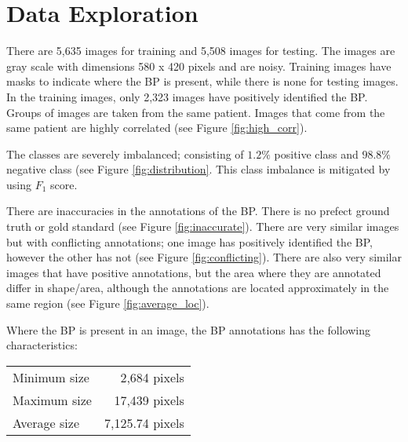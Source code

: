 \section{Data Exploration}
There are 5,635 images for training and 5,508 images for testing. The images are gray scale with dimensions 580 x 420 pixels and are noisy. Training images have masks to indicate where the BP is present, while there is none for testing images. In the training images, only 2,323 images have positively identified the BP.
Groups of images are taken from the same patient.  Images that come from the same patient are highly correlated (see Figure \ref{fig:high_corr}).

The classes are severely imbalanced; consisting of $1.2\%$ positive class and $98.8\%$ negative class (see Figure \ref{fig:distribution}. This class imbalance is mitigated by using $F_1$ score.

There are inaccuracies in the annotations of the BP. There is no prefect ground truth or gold standard (see Figure \ref{fig:inaccurate}). There are very similar images but with conflicting annotations; one image has positively identified the BP, however the other has not (see Figure \ref{fig:conflicting}). There are also very similar images that have positive annotations, but the area where they are annotated differ in shape/area, although the annotations are located approximately in the same region (see Figure \ref{fig:average_loc}).

Where the BP is present in an image, the BP annotations has the following characteristics:

\begin{center}
\begin{tabular}{l r}
Minimum size &    2,684 pixels \\
Maximum size &   17,439 pixels \\
Average size & 7,125.74 pixels \\
\end{tabular}
\end{center}
